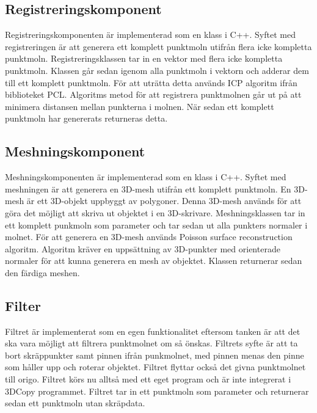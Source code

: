 \documentclass[a4paper,titlepage,12pt]{article}
\begin{document}
	\subsection{Registreringskomponent}
		Registreringskomponenten är implementerad som en klass i C++. Syftet med registreringen är att generera ett komplett punktmoln utifrån flera icke kompletta punktmoln. Registreringsklassen tar in en vektor med flera icke kompletta punktmoln. Klassen går sedan igenom alla punktmoln i vektorn och adderar dem till ett komplett punktmoln. För att uträtta detta används ICP algoritm ifrån biblioteket PCL. Algoritms metod för att registrera punktmolnen går ut på att minimera distansen mellan punkterna i molnen. När sedan ett komplett punktmoln har genererats returneras detta.
	
	\subsection{Meshningskomponent}
		Meshningskomponenten är implementerad som en klass i C++. Syftet med meshningen är att generera en 3D-mesh utifrån ett komplett punktmoln. En 3D-mesh är ett 3D-objekt uppbyggt av polygoner. Denna 3D-mesh används för att göra det möjligt att skriva ut objektet i en 3D-skrivare. Meshningsklassen tar in ett komplett punkmoln som parameter och tar sedan ut alla punkters normaler i molnet. För att generera en 3D-mesh används Poisson surface reconstruction algoritm. Algoritm kräver en uppsättning av 3D-punkter med orienterade normaler för att kunna generera en mesh av objektet. Klassen returnerar sedan den färdiga meshen.
	
	\subsection{Filter}
		Filtret är implementerat som en egen funktionalitet eftersom tanken är att det ska vara möjligt att filtrera punktmolnet om så önskas. Filtrets syfte är att ta bort skräppunkter samt pinnen ifrån punkmolnet, med pinnen menas den pinne som håller upp och roterar objektet. Filtret flyttar också det givna punktmolnet till origo. Filtret körs nu alltså med ett eget program och är inte integrerat i 3DCopy programmet. Filtret tar in ett punktmoln som parameter och returnerar sedan ett punktmoln utan skräpdata.
		
\newpage
 
\end{document}
